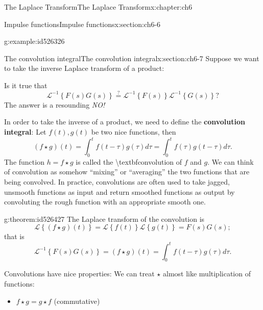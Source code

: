\documentclass[oneside,10pt,]{book}
\newcommand{\terminology}[1]{\textbf{#1}}
\numberwithin{equation}{section}
\numberwithin{equation}{section}
\begin{document}
\begin{chapterptx}{The Laplace Transform}{}{The Laplace Transform}{}{}{x:chapter:ch6}
\begin{sectionptx}{Impulse functions}{}{Impulse functions}{}{}{x:section:ch6-6}
\begin{example}{}{g:example:id526326}
\end{example}
\end{sectionptx}
%
%
\typeout{************************************************}
\typeout{************************************************}
%
\begin{sectionptx}{The convolution integral}{}{The convolution integral}{}{}{x:section:ch6-7}
Suppose we want to take the inverse Laplace transform of a product:%
\par
Is it true that%
\begin{equation*}
\mathcal{L}^{-1}\left\{ F(s)G(s)\right\} \overset{?}{=}\mathcal{L}^{-1}\left\{ F(s)\right\} \mathcal{L}^{-1}\left\{ G(s)\right\}?
\end{equation*}
The answer is a resounding \emph{NO!}%
\par
In order to take the inverse of a product, we need to define the \terminology{convolution integral}: Let \(f(t),g(t)\) be two nice functions, then%
\begin{equation*}
\left(f\star g\right)(t)=\int_{0}^{t}f\left(t-\tau\right)g\left(\tau\right)d\tau=\int_{0}^{t}f(\tau)g\left(t-\tau\right)d\tau.
\end{equation*}
The function \(h=f\star g\) is called the \textbackslash{}textbf\textbraceleft{}convolution\textbraceright{} of \(f\) and \(g\). We can think of convolution as somehow ``mixing'' or ``averaging'' the two functions that are being convolved. In practice, convolutions are often used to take jagged, unsmooth functions as input and return smoothed functions as output by convoluting the rough function with an appropriate smooth one.%
\begin{theorem}{}{}{g:theorem:id526427}%
The Laplace transform of the convolution is%
\begin{equation*}
\mathcal{L}\left\{ \left(f\star g\right)(t)\right\} =\mathcal{L}\left\{ f(t)\right\} \mathcal{L}\left\{ g(t)\right\} =F(s)G(s);
\end{equation*}
that is%
\begin{equation*}
\mathcal{L}^{-1}\left\{ F(s)G(s)\right\} =\left(f\star g\right)(t)=\int_{0}^{t}f\left(t-\tau\right)g\left(\tau\right)d\tau.
\end{equation*}
%
\end{theorem}
Convolutions have nice properties: We can treat \(\star\) almost like multiplication of functions:%
\begin{itemize}[label=\textbullet]
\item{}\(f\star g=g\star f\) (commutative)%

\end{itemize}
\end{sectionptx}
\end{chapterptx}
\end{document}
